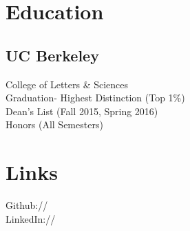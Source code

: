 \documentclass[]{deedy-resume-openfont}
\begin{document}
%
%
\lastupdated

%
%



%
%

\begin{minipage}[t]{0.33\textwidth} 


\section{Education} 

\subsection{UC Berkeley}


College of Letters \& Sciences \\
Graduation- Highest Distinction (Top 1\%)\\
Dean's List (Fall 2015, Spring 2016)\\
Honors (All Semesters)\\
\sectionsep


\section{Links} 
Github:// \href{https://github.com/jlevy44}{} \\
LinkedIn://  \href{https://www.linkedin.com/in/joshua-levy-87044913b/}{} \\
\sectionsep



\end{minipage}
\end{document}
